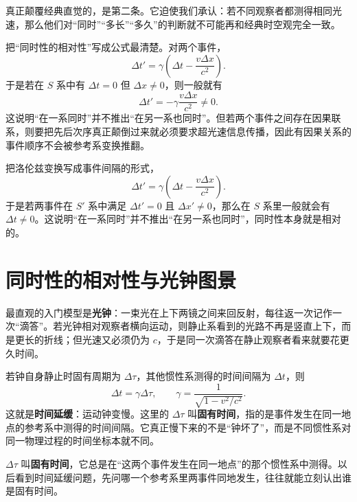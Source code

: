 \documentclass[lang=cn,11pt]{elegantbook}
\newcommand{\bridge}[1]{\begin{note}#1\end{note}}
\begin{document}
真正颠覆经典直觉的，是第二条。它迫使我们承认：若不同观察者都测得相同光速，那么他们对“同时”“多长”“多久”的判断就不可能再和经典时空观完全一致。

\bridge{把“同时性的相对性”写成公式最清楚。对两个事件，
\[
\Delta t'=\gamma\left(\Delta t-\frac{v\Delta x}{c^2}\right).
\]
于是若在 \(S\) 系中有 \(\Delta t=0\) 但 \(\Delta x\neq 0\)，则一般就有
\[
\Delta t'=-\gamma\frac{v\Delta x}{c^2}\neq 0.
\]
这说明“在一系同时”并不推出“在另一系也同时”。但若两个事件之间存在因果联系，则要把先后次序真正颠倒过来就必须要求超光速信息传播，因此有因果关系的事件顺序不会被参考系变换推翻。}

\begin{remark}
把洛伦兹变换写成事件间隔的形式，
\[
\Delta t'=\gamma\left(\Delta t-\frac{v\Delta x}{c^2}\right).
\]
于是若两事件在 \(S'\) 系中满足 \(\Delta t'=0\) 且 \(\Delta x'\neq 0\)，那么在 \(S\) 系里一般就会有 \(\Delta t\neq 0\)。这说明“在一系同时”并不推出“在另一系也同时”，同时性本身就是相对的。
\end{remark}

\section{同时性的相对性与光钟图景}

最直观的入门模型是\textbf{光钟}：一束光在上下两镜之间来回反射，每往返一次记作一次“滴答”。若光钟相对观察者横向运动，则静止系看到的光路不再是竖直上下，而是更长的折线；但光速又必须仍为 \(c\)，于是同一次滴答在静止观察者看来就要花更久时间。

\begin{center}
\end{center}

若钟自身静止时固有周期为 \(\Delta \tau\)，其他惯性系测得的时间间隔为 \(\Delta t\)，则
\[
\Delta t=\gamma \Delta \tau,
\qquad
\gamma=\frac{1}{\sqrt{1-v^2/c^2}}.
\]
这就是\textbf{时间延缓}：运动钟变慢。这里的 \(\Delta\tau\) 叫\textbf{固有时间}，指的是事件发生在同一地点的参考系中测得的时间间隔。它真正慢下来的不是“钟坏了”，而是不同惯性系对同一物理过程的时间坐标本就不同。

\begin{note}
\(\Delta \tau\) 叫\textbf{固有时间}，它总是在“这两个事件发生在同一地点”的那个惯性系中测得。以后看到时间延缓问题，先问哪一个参考系里两事件同地发生，往往就能立刻认出谁是固有时间。
\end{note}
\end{document}
